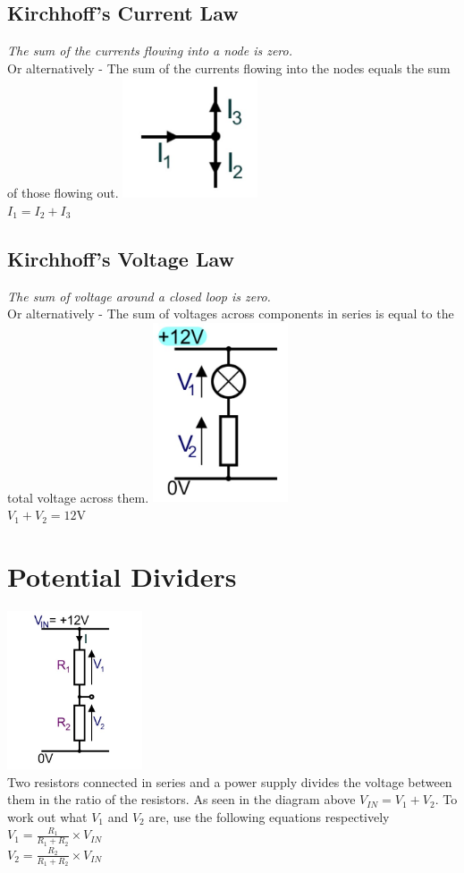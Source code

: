 \documentclass[a4paper,11pt, twocolumn]{article}
\begin{document}
\subsection{Kirchhoff's Current Law}
\textit{The sum of the currents flowing into a node is zero.}\\
Or alternatively - The sum of the currents flowing into the nodes equals the sum of those flowing out.
\includegraphics[width=0.3\textwidth]{kcl.jpg}\\
$I_1 = I_2+ I_3$
\subsection{Kirchhoff's Voltage Law}
\textit{The sum of voltage around a closed loop is zero.}\\
Or alternatively - The sum of voltages across components in series is equal to the total voltage across them.
\includegraphics[width=0.3\textwidth]{kvl.jpg}\\
$V_1 + V_2 = 12\mathrm{V}$

\section{Potential Dividers}
\includegraphics[width=0.3\textwidth]{potDev.jpg}\\
Two resistors connected in series and a power supply divides the voltage between them in the ratio of the resistors. As seen in the diagram above $V_{IN} = V_1+V_2$. To work out what $V_1$ and $V_2$ are, use the following equations respectively $\displaystyle V_1 = \frac{R_1}{R_1 + R_2}\times V_{IN}$\\
$\displaystyle V_2 = \frac{R_2}{R_1 + R_2}\times V_{IN}$
\end{document}
